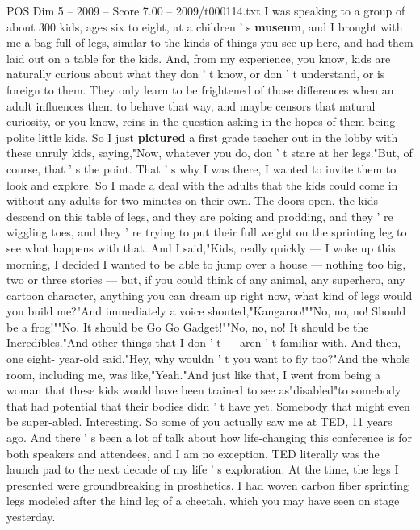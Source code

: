 \begin{textsample}{POS Dim 5 – 2009 – Score 7.00 – 2009/t000114.txt}  \label{ex:f5_pos_035}
I was speaking to a group of about 300 kids, ages six to eight, at a children ' s \textbf{museum}, and I brought with me a bag full of legs, similar to the kinds of things you see up here, and had them laid out on a table for the kids.
And, from my experience, you know, kids are naturally curious about what they don ' t know, or don ' t understand, or is foreign to them.
They only learn to be frightened of those differences when an adult influences them to behave that way, and maybe censors that natural curiosity, or you know, reins in the question-asking in the hopes of them being polite little kids.
So I just \textbf{pictured} a first grade teacher out in the lobby with these unruly kids, saying,"Now, whatever you do, don ' t stare at her legs."But, of course, that ' s the point.
That ' s why I was there, I wanted to invite them to look and explore.
So I made a deal with the adults that the kids could come in without any adults for two minutes on their own.
The doors open, the kids descend on this table of legs, and they are poking and prodding, and they ' re wiggling toes, and they ' re trying to put their full weight on the sprinting leg to see what happens with that.
And I said,"Kids, really quickly — I woke up this morning, I decided I wanted to be able to jump over a house — nothing too big, two or three stories — but, if you could think of any animal, any superhero, any cartoon character, anything you can dream up right now, what kind of legs would you build me?"And immediately a voice shouted,"Kangaroo!""No, no, no!
Should be a frog!""No.
It should be Go Go Gadget!""No, no, no!
It should be the Incredibles."And other things that I don ' t — aren ' t familiar with.
And then, one eight- year-old said,"Hey, why wouldn ' t you want to fly too?"And the whole room, including me, was like,"Yeah."And just like that, I went from being a woman that these kids would have been trained to see as"disabled"to somebody that had potential that their bodies didn ' t have yet.
Somebody that might even be super-abled.
Interesting.
So some of you actually saw me at TED, 11 years ago.
And there ' s been a lot of talk about how life-changing this conference is for both speakers and attendees, and I am no exception.
TED literally was the launch pad to the next decade of my life ' s exploration.
At the time, the legs I presented were groundbreaking in prosthetics.
I had woven carbon fiber sprinting legs modeled after the hind leg of a cheetah, which you may have seen on stage yesterday.

\end{textsample}
